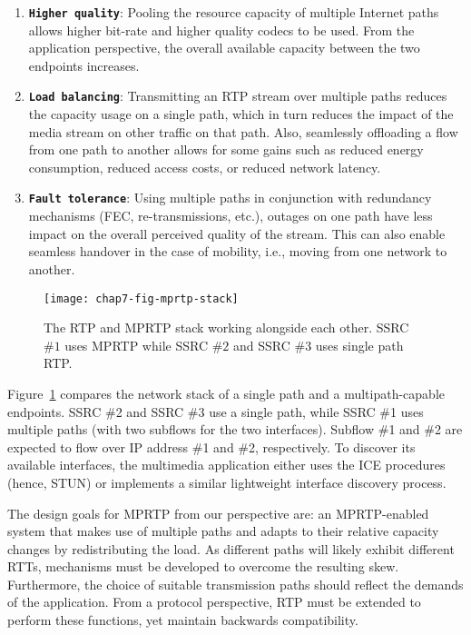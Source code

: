 \begin{enumerate}
\setlength{\itemsep}{5pt}

\item \textbf{\texttt{Higher quality}}: Pooling the resource capacity of
multiple Internet paths allows higher bit-rate and higher quality codecs to be
used. From the application perspective, the overall available capacity between the
two endpoints increases.

\item \textbf{\texttt{Load balancing}}: Transmitting an RTP stream over
multiple paths reduces the capacity usage on a single path, which in turn
reduces the impact of the media stream on other traffic on that path. Also,
seamlessly offloading a flow from one path to another allows for some gains
such as reduced energy consumption, reduced access costs, or reduced
network latency.

\item \textbf{\texttt{Fault tolerance}}: Using multiple paths in conjunction
with redundancy mechanisms (FEC, re-transmissions, etc.), outages on one path
have less impact on the overall perceived quality of the stream. This can also
enable seamless handover in the case of mobility, i.e., moving from one
network to another.

\end{enumerate}


\begin{figure}[!t]
\centerline {
\texttt{[image: chap7-fig-mprtp-stack]}
}
\caption{The RTP and MPRTP stack working alongside each other. SSRC $\#1$ uses
MPRTP while SSRC $\#2$ and SSRC $\#3$ uses single path RTP.}
\label{chap7:fig_mprtp_arch}
\end{figure}

Figure~\ref{chap7:fig_mprtp_arch} compares the network stack of a single path
and a multipath-capable endpoints. SSRC \#2 and SSRC \#3 use a single path,
while SSRC \#1 uses multiple paths (with two subflows for the two interfaces).
Subflow \#1 and \#2 are expected to flow over IP address \#1 and \#2,
respectively. To discover its available interfaces, the multimedia application
either uses the ICE procedures (hence, STUN) or implements a similar
lightweight interface discovery process.

The design goals for MPRTP from our perspective are: an MPRTP-enabled system that 
makes use of multiple paths and adapts to their relative capacity
changes by redistributing the load. As different paths will likely exhibit
different RTTs, mechanisms must be developed to overcome the resulting skew.
Furthermore, the choice of suitable transmission paths should reflect the
demands of the application. From a protocol perspective, RTP must be extended
to perform these functions, yet maintain backwards compatibility.


